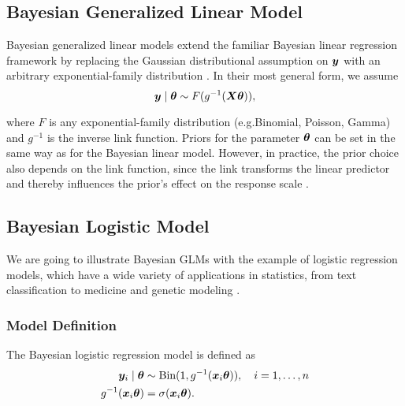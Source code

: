 \subsection{Bayesian Generalized Linear Model}\label{sec:logit-glm}

Bayesian generalized linear models extend the familiar Bayesian linear regression framework by replacing the Gaussian distributional assumption on $\bm{y}$ with an arbitrary exponential-family distribution \citep{nelder_generalized_1972,west_dynamic_1985}. 
In their most general form, we assume
\begin{equation*}
    \bm{y} \mid \bm{\theta} \sim F(g^{-1}(\bm{X} \bm{\theta})),
\end{equation*}

where $F$ is any exponential-family distribution (e.g.\@ Binomial, Poisson, Gamma) and $g^{-1}$ is the inverse link function.
Priors for the parameter $\bm{\theta}$ can be set in the same way as for the Bayesian linear model. However, in practice, the prior choice also depends on the link function, since the link transforms the linear predictor and thereby influences the prior's effect on the response scale \citep{west_dynamic_1985,hosack_prior_2017}.

\subsection{Bayesian Logistic Model} \label{sec:logit-logit}

We are going to illustrate Bayesian GLMs with the example of logistic regression models, which have a wide variety of applications in statistics, from text classification to medicine and genetic modeling \citep[see e.g.][for interesting applications]{dayanik_constructing_2006,sondhi_bayesian_2021}.

\subsubsection*{Model Definition}

The Bayesian logistic regression model is defined as
\begin{equation}\label{eq:logit}
    \begin{aligned}
        \bm{y}_i \mid \bm{\theta} &\sim \text{Bin}(1, g^{-1}(\bm{x}_i \bm{\theta})), \quad i = 1, \dots, n \\
        g^{-1}(\bm{x}_i \bm{\theta}) &= \sigma(\bm{x}_i \bm{\theta}).
    \end{aligned}
\end{equation}

